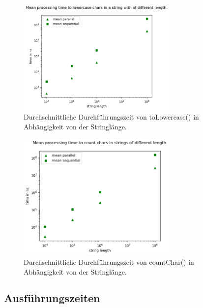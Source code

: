 \documentclass[plainarticle,zihtitle,german,final,hyperref,utf8]{zihpub}
\begin{document}
\begin{figure}[h]
	\begin{center}
		\includegraphics[width=0.7\textwidth]{images/complex_lower.png}
		\caption{Durchschnittliche Durchführungszeit von toLowercase() in Abhängigkeit von der Stringlänge.}
		\label{fig:mean_upper}
	\end{center}
\end{figure}

\begin{figure}[h]
	\begin{center}
		\includegraphics[width=0.7\textwidth]{images/complex_count.png}
		\caption{Durchschnittliche Durchführungszeit von countChar() in Abhängigkeit von der Stringlänge.}
		\label{fig:mean_upper}
	\end{center}
\end{figure}


\subsection{Ausführungszeiten}
\end{document}
